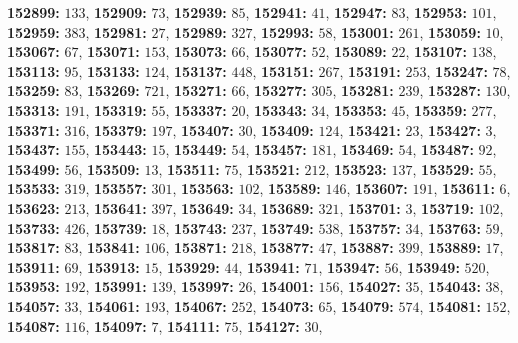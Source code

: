 \textsf{\bfseries 152899:} $133$, \textsf{\bfseries 152909:} $73$, \textsf{\bfseries 152939:} $85$, \textsf{\bfseries 152941:} $41$, \textsf{\bfseries 152947:} $83$, \textsf{\bfseries 152953:} $101$, \textsf{\bfseries 152959:} $383$, \textsf{\bfseries 152981:} $27$, \textsf{\bfseries 152989:} $327$, \textsf{\bfseries 152993:} $58$, \textsf{\bfseries 153001:} $261$, \textsf{\bfseries 153059:} $10$, \textsf{\bfseries 153067:} $67$, \textsf{\bfseries 153071:} $153$, \textsf{\bfseries 153073:} $66$, \textsf{\bfseries 153077:} $52$, \textsf{\bfseries 153089:} $22$, \textsf{\bfseries 153107:} $138$, \textsf{\bfseries 153113:} $95$, \textsf{\bfseries 153133:} $124$, \textsf{\bfseries 153137:} $448$, \textsf{\bfseries 153151:} $267$, \textsf{\bfseries 153191:} $253$, \textsf{\bfseries 153247:} $78$, \textsf{\bfseries 153259:} $83$, \textsf{\bfseries 153269:} $721$, \textsf{\bfseries 153271:} $66$, \textsf{\bfseries 153277:} $305$, \textsf{\bfseries 153281:} $239$, \textsf{\bfseries 153287:} $130$, \textsf{\bfseries 153313:} $191$, \textsf{\bfseries 153319:} $55$, \textsf{\bfseries 153337:} $20$, \textsf{\bfseries 153343:} $34$, \textsf{\bfseries 153353:} $45$, \textsf{\bfseries 153359:} $277$, \textsf{\bfseries 153371:} $316$, \textsf{\bfseries 153379:} $197$, \textsf{\bfseries 153407:} $30$, \textsf{\bfseries 153409:} $124$, \textsf{\bfseries 153421:} $23$, \textsf{\bfseries 153427:} $3$, \textsf{\bfseries 153437:} $155$, \textsf{\bfseries 153443:} $15$, \textsf{\bfseries 153449:} $54$, \textsf{\bfseries 153457:} $181$, \textsf{\bfseries 153469:} $54$, \textsf{\bfseries 153487:} $92$, \textsf{\bfseries 153499:} $56$, \textsf{\bfseries 153509:} $13$, \textsf{\bfseries 153511:} $75$, \textsf{\bfseries 153521:} $212$, \textsf{\bfseries 153523:} $137$, \textsf{\bfseries 153529:} $55$, \textsf{\bfseries 153533:} $319$, \textsf{\bfseries 153557:} $301$, \textsf{\bfseries 153563:} $102$, \textsf{\bfseries 153589:} $146$, \textsf{\bfseries 153607:} $191$, \textsf{\bfseries 153611:} $6$, \textsf{\bfseries 153623:} $213$, \textsf{\bfseries 153641:} $397$, \textsf{\bfseries 153649:} $34$, \textsf{\bfseries 153689:} $321$, \textsf{\bfseries 153701:} $3$, \textsf{\bfseries 153719:} $102$, \textsf{\bfseries 153733:} $426$, \textsf{\bfseries 153739:} $18$, \textsf{\bfseries 153743:} $237$, \textsf{\bfseries 153749:} $538$, \textsf{\bfseries 153757:} $34$, \textsf{\bfseries 153763:} $59$, \textsf{\bfseries 153817:} $83$, \textsf{\bfseries 153841:} $106$, \textsf{\bfseries 153871:} $218$, \textsf{\bfseries 153877:} $47$, \textsf{\bfseries 153887:} $399$, \textsf{\bfseries 153889:} $17$, \textsf{\bfseries 153911:} $69$, \textsf{\bfseries 153913:} $15$, \textsf{\bfseries 153929:} $44$, \textsf{\bfseries 153941:} $71$, \textsf{\bfseries 153947:} $56$, \textsf{\bfseries 153949:} $520$, \textsf{\bfseries 153953:} $192$, \textsf{\bfseries 153991:} $139$, \textsf{\bfseries 153997:} $26$, \textsf{\bfseries 154001:} $156$, \textsf{\bfseries 154027:} $35$, \textsf{\bfseries 154043:} $38$, \textsf{\bfseries 154057:} $33$, \textsf{\bfseries 154061:} $193$, \textsf{\bfseries 154067:} $252$, \textsf{\bfseries 154073:} $65$, \textsf{\bfseries 154079:} $574$, \textsf{\bfseries 154081:} $152$, \textsf{\bfseries 154087:} $116$, \textsf{\bfseries 154097:} $7$, \textsf{\bfseries 154111:} $75$, \textsf{\bfseries 154127:} $30$, 
